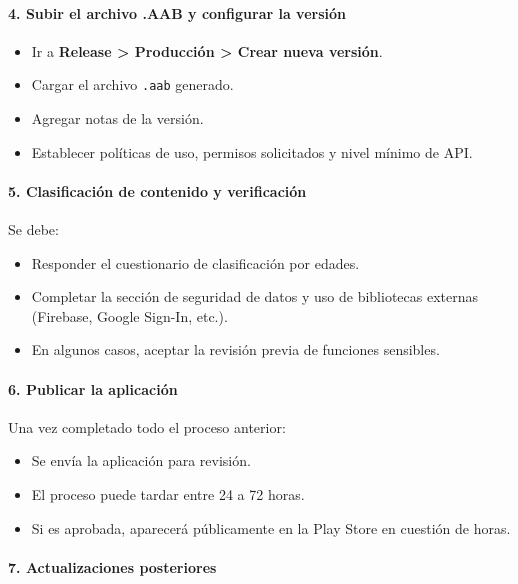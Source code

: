 \paragraph{4. Subir el archivo .AAB y configurar la versión}

\begin{itemize}
    \item Ir a \textbf{Release > Producción > Crear nueva versión}.
    \item Cargar el archivo \texttt{.aab} generado.
    \item Agregar notas de la versión.
    \item Establecer políticas de uso, permisos solicitados y nivel mínimo de API.
\end{itemize}

\paragraph{5. Clasificación de contenido y verificación}

Se debe:

\begin{itemize}
    \item Responder el cuestionario de clasificación por edades.
    \item Completar la sección de seguridad de datos y uso de bibliotecas externas (Firebase, Google Sign-In, etc.).
    \item En algunos casos, aceptar la revisión previa de funciones sensibles.
\end{itemize}

\paragraph{6. Publicar la aplicación}

Una vez completado todo el proceso anterior:

\begin{itemize}
    \item Se envía la aplicación para revisión.
    \item El proceso puede tardar entre 24 a 72 horas.
    \item Si es aprobada, aparecerá públicamente en la Play Store en cuestión de horas.
\end{itemize}

\paragraph{7. Actualizaciones posteriores}

